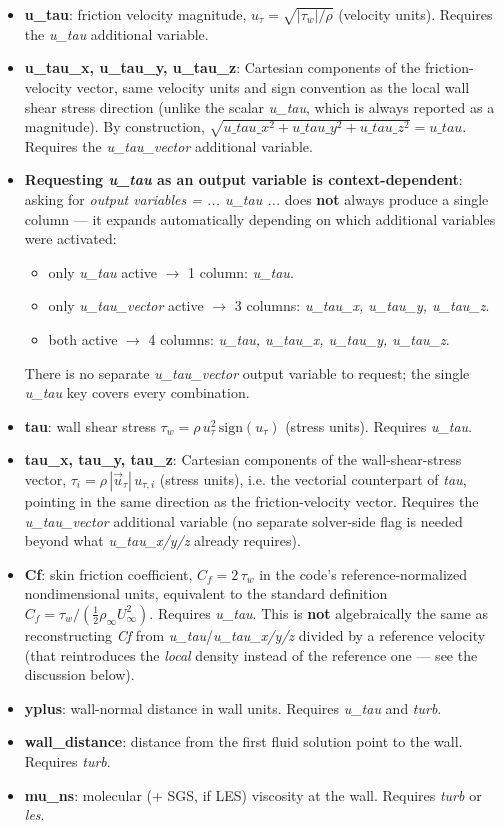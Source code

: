 \documentclass[a4paper,10pt]{report}
\begin{document}
\begin{itemize}
\item \textbf{u\_tau}: friction velocity magnitude, $u_\tau = \sqrt{|\tau_w|/\rho}$ (velocity units). Requires the \textit{u\_tau} additional variable.
\item \textbf{u\_tau\_x, u\_tau\_y, u\_tau\_z}: Cartesian components of the friction-velocity vector, same velocity units and sign convention as the local wall shear stress direction (unlike the scalar \textit{u\_tau}, which is always reported as a magnitude). By construction, $\sqrt{u\_tau\_x^2+u\_tau\_y^2+u\_tau\_z^2} = u\_tau$. Requires the \textit{u\_tau\_vector} additional variable.
\item \textbf{Requesting \textit{u\_tau} as an output variable is context-dependent}: asking for \textit{output variables = ... u\_tau ...} does \textbf{not} always produce a single column --- it expands automatically depending on which additional variables were activated:
  \begin{itemize}
  \item only \textit{u\_tau} active $\rightarrow$ 1 column: \textit{u\_tau}.
  \item only \textit{u\_tau\_vector} active $\rightarrow$ 3 columns: \textit{u\_tau\_x, u\_tau\_y, u\_tau\_z}.
  \item both active $\rightarrow$ 4 columns: \textit{u\_tau, u\_tau\_x, u\_tau\_y, u\_tau\_z}.
  \end{itemize}
  There is no separate \textit{u\_tau\_vector} output variable to request; the single \textit{u\_tau} key covers every combination.
\item \textbf{tau}: wall shear stress $\tau_w = \rho\,u_\tau^2\,\text{sign}(u_\tau)$ (stress units). Requires \textit{u\_tau}.
\item \textbf{tau\_x, tau\_y, tau\_z}: Cartesian components of the wall-shear-stress vector, $\tau_i = \rho\,|\vec{u}_\tau|\,u_{\tau,i}$ (stress units), i.e. the vectorial counterpart of \textit{tau}, pointing in the same direction as the friction-velocity vector. Requires the \textit{u\_tau\_vector} additional variable (no separate solver-side flag is needed beyond what \textit{u\_tau\_x/y/z} already requires).
\item \textbf{Cf}: skin friction coefficient, $C_f = 2\,\tau_w$ in the code's reference-normalized nondimensional units, equivalent to the standard definition $C_f = \tau_w/(\tfrac{1}{2}\rho_\infty U_\infty^2)$. Requires \textit{u\_tau}. This is \textbf{not} algebraically the same as reconstructing \textit{Cf} from \textit{u\_tau}/\textit{u\_tau\_x/y/z} divided by a reference velocity (that reintroduces the \textit{local} density instead of the reference one --- see the discussion below).
\item \textbf{yplus}: wall-normal distance in wall units. Requires \textit{u\_tau} and \textit{turb}.
\item \textbf{wall\_distance}: distance from the first fluid solution point to the wall. Requires \textit{turb}.
\item \textbf{mu\_ns}: molecular (+ SGS, if LES) viscosity at the wall. Requires \textit{turb} or \textit{les}.
\end{itemize}
\end{document}

